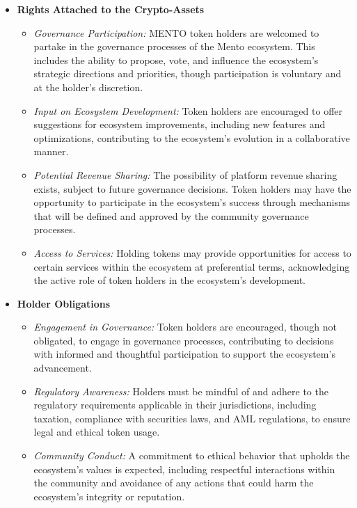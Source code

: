 \documentclass[a4paper]{article}
\theoremstyle{definition}
\begin{document}
\begin{itemize}
    \item \textbf{Rights Attached to the Crypto-Assets}
    \begin{itemize}
        \item \textit{Governance Participation:} MENTO token holders are welcomed to partake in the governance processes of the Mento ecosystem. This includes the ability to propose, vote, and influence the ecosystem’s strategic directions and priorities, though participation is voluntary and at the holder's discretion.
        
        \item \textit{Input on Ecosystem Development:} Token holders are encouraged to offer suggestions for ecosystem improvements, including new features and optimizations, contributing to the ecosystem's evolution in a collaborative manner.
        
        \item \textit{Potential Revenue Sharing:} The possibility of platform revenue sharing exists, subject to future governance decisions. Token holders may have the opportunity to participate in the ecosystem's success through mechanisms that will be defined and approved by the community governance processes.
        
        \item \textit{Access to Services:} Holding tokens may provide opportunities for access to certain services within the ecosystem at preferential terms, acknowledging the active role of token holders in the ecosystem’s development.
    \end{itemize}
    
    \item \textbf{Holder Obligations}
    \begin{itemize}
        \item \textit{Engagement in Governance:} Token holders are encouraged, though not obligated, to engage in governance processes, contributing to decisions with informed and thoughtful participation to support the ecosystem’s advancement.
        
        \item \textit{Regulatory Awareness:} Holders must be mindful of and adhere to the regulatory requirements applicable in their jurisdictions, including taxation, compliance with securities laws, and AML regulations, to ensure legal and ethical token usage.
        
        \item \textit{Community Conduct:} A commitment to ethical behavior that upholds the ecosystem's values is expected, including respectful interactions within the community and avoidance of any actions that could harm the ecosystem’s integrity or reputation.
        

\end{itemize}
\end{itemize}
\end{document}
